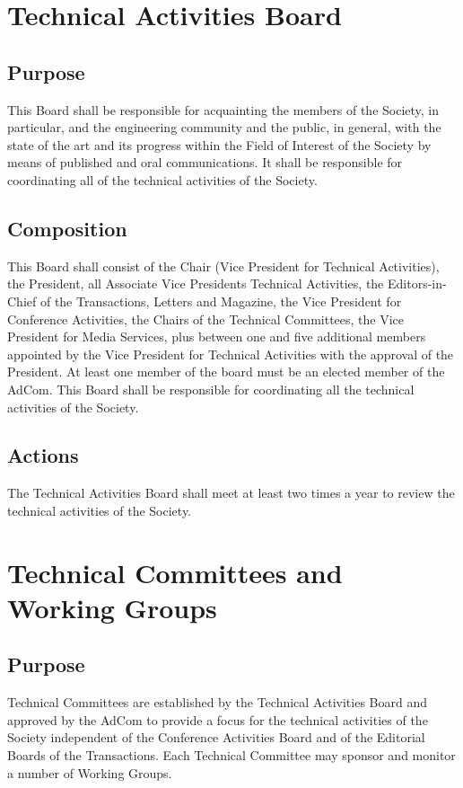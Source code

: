 \documentclass[10pt]{article}
\begin{document}
\section{Technical Activities Board}
\label{TAB}

\subsection{Purpose}

This Board shall be responsible for acquainting the members of the Society, in particular, and the engineering community and the public, in general, with the state of the art and its progress within the Field of Interest of the Society by means of published and oral communications. It shall be responsible for coordinating all of the technical activities of the Society.


\subsection{Composition}

This Board shall consist of the Chair (Vice President for Technical Activities), the President, all Associate Vice Presidents Technical Activities, the Editors-in-Chief of the Transactions, Letters and Magazine, the Vice President for Conference Activities, the Chairs of the Technical Committees, the Vice President for Media Services, plus between one and five additional members appointed by the Vice President for Technical Activities with the approval of the President. At least one member of the board must be an elected member of the AdCom. This Board shall be responsible for coordinating all the technical activities of the Society.


\subsection{Actions}

The Technical Activities Board shall meet at least two times a year to review the technical activities of the Society. 


\section{Technical Committees and Working Groups}
\label{TCs}



\subsection{Purpose}
Technical Committees are established by the Technical Activities Board and approved by the AdCom to provide a focus for the technical activities of the Society independent of the Conference Activities Board and of the Editorial Boards of the Transactions. Each Technical Committee may sponsor and monitor a number of Working Groups.
\end{document}
